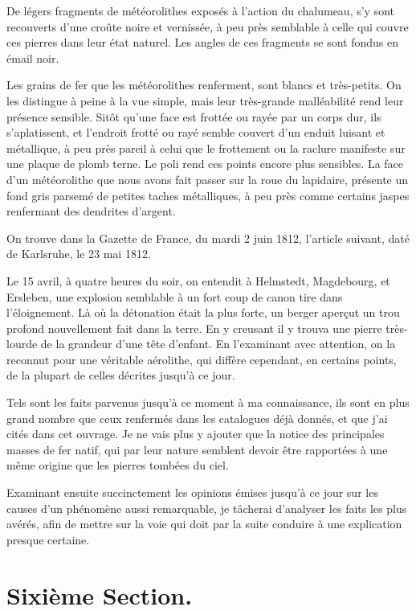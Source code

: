 \documentclass[a4paper, 12pt, oneside, french]{article}
\begin{document}
\og De légers fragments de météorolithes exposés à l'action du chalumeau, s'y sont recouverts d'une croûte noire et vernissée, à peu près semblable à celle qui couvre ces pierres dans leur état naturel. Les angles de ces fragments se sont fondus en émail noir. \fg

\og Les grains de fer que les météorolithes renferment, sont blancs et très-petits. On les distingue à peine à la vue simple, mais leur très-grande malléabilité rend leur présence sensible. Sitôt qu'une face est frottée ou rayée par un corps dur, ils s'aplatissent, et l'endroit frotté ou rayé semble couvert d'un enduit luisant et métallique, à peu près pareil à celui que le frottement ou la raclure manifeste sur une plaque de plomb terne. Le poli rend ces points encore plus sensibles. La face d'un météorolithe que nous avons fait passer sur la roue du lapidaire, présente un fond gris parsemé de petites taches métalliques, à peu près comme certains jaspes renfermant des dendrites d'argent. \fg

On trouve dans la Gazette de France, du mardi 2 juin 1812, l'article suivant, daté de Karlsruhe, le 23 mai 1812.

\og Le 15 avril, à quatre heures du soir, on entendit à Helmstedt, Magdebourg, et Ersleben, une explosion semblable à un fort coup de canon tire dans l'éloignement. Là où la détonation était la plus forte, un berger aperçut un trou profond nouvellement fait dans la terre. En y creusant il y trouva une pierre très-lourde de la grandeur d'une tête d'enfant. En l'examinant avec attention, on la reconnut pour une véritable aérolithe, qui diffère cependant, en certains points, de la plupart de celles décrites jusqu'à ce jour. \fg

Tels sont les faits parvenus jusqu'à ce moment à ma connaissance, ils sont en plus grand nombre que ceux renfermés dans les catalogues déjà donnés, et que j'ai cités dans cet ouvrage. Je ne vais plus y ajouter que la notice des principales masses de fer natif, qui par leur nature semblent devoir être rapportées à une même origine que les pierres tombées du ciel.

Examinant ensuite succinctement les opinions émises jusqu'à ce jour sur les causes d'un phénomène aussi remarquable, je tâcherai d'analyser les faits les plus avérés, afin de mettre sur la voie qui doit par la suite conduire à une explication presque certaine.
\clearpage
\section{Sixième Section.}
\end{document}
